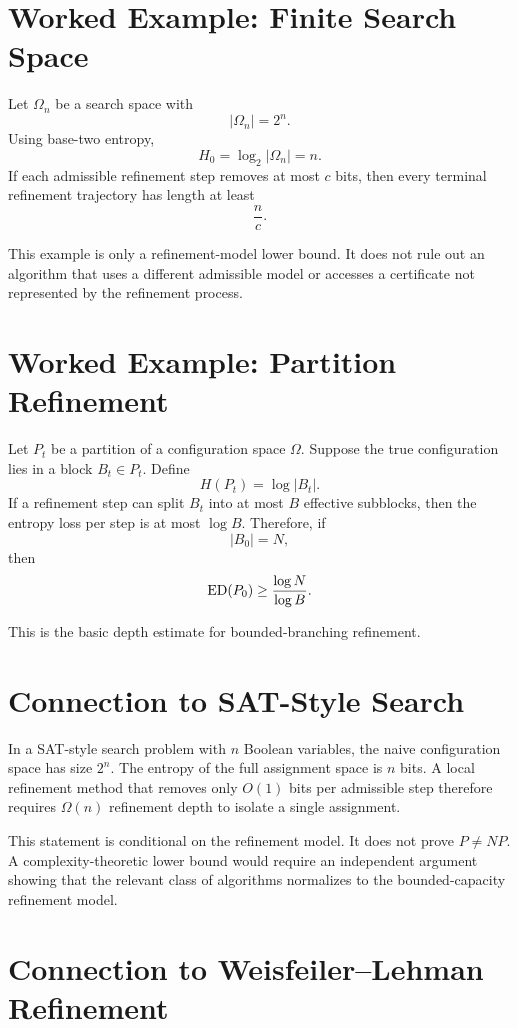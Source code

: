 \section{Worked Example: Finite Search Space}

Let \(\Omega_n\) be a search space with
\[
|\Omega_n|=2^n.
\]
Using base-two entropy,
\[
H_0=\log_2|\Omega_n|=n.
\]
If each admissible refinement step removes at most \(c\) bits, then every
terminal refinement trajectory has length at least
\[
\frac{n}{c}.
\]

This example is only a refinement-model lower bound. It does not rule out an
algorithm that uses a different admissible model or accesses a certificate not
represented by the refinement process.

\section{Worked Example: Partition Refinement}

Let \(P_t\) be a partition of a configuration space \(\Omega\). Suppose the
true configuration lies in a block \(B_t\in P_t\). Define
\[
H(P_t)=\log |B_t|.
\]
If a refinement step can split \(B_t\) into at most \(B\) effective subblocks,
then the entropy loss per step is at most \(\log B\). Therefore, if
\[
|B_0|=N,
\]
then
\[
\mathrm{ED}(P_0)\ge \frac{\log N}{\log B}.
\]

This is the basic depth estimate for bounded-branching refinement.

\section{Connection to SAT-Style Search}

In a SAT-style search problem with \(n\) Boolean variables, the naive
configuration space has size \(2^n\). The entropy of the full assignment space
is \(n\) bits. A local refinement method that removes only \(O(1)\) bits per
admissible step therefore requires \(\Omega(n)\) refinement depth to isolate a
single assignment.

This statement is conditional on the refinement model. It does not prove
\(P\ne NP\). A complexity-theoretic lower bound would require an independent
argument showing that the relevant class of algorithms normalizes to the
bounded-capacity refinement model.

\section{Connection to Weisfeiler--Lehman Refinement}

